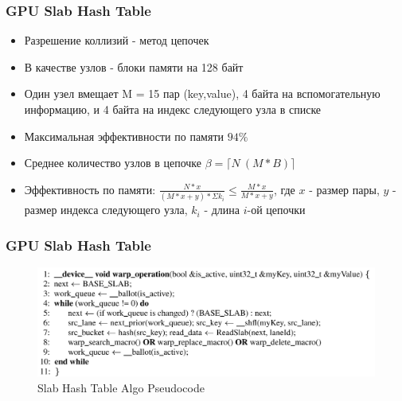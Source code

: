 \documentclass[xcolor=table,english]{beamer}
\begin{document}
\begin{frame}[fragile] \frametitle{GPU Slab Hash Table}
    \begin{itemize}
        \item Разрешение коллизий - метод цепочек
        \item В качестве узлов - блоки памяти на 128 байт
        \item Один узел вмещает M = 15 пар (key,value), 4 байта на вспомогательную информацию, и 4 байта на индекс следующего узла в списке
        \item Максимальная эффективности по памяти $94\%$
        \item Среднее количество узлов в цепочке $\beta = \lceil N \ (M * B) \rceil$
        \item Эффективность по памяти: $\frac{N * x}{(M * x + y) * \Sigma k_i} \leq \frac{M * x}{M * x + y}$, где $x$ - размер пары, $y$ - размер индекса следующего узла, $k_i$ - длина $i$-ой цепочки
    \end{itemize}
\end{frame}

\begin{frame}[fragile] \frametitle{GPU Slab Hash Table}
    \begin{minipage}[m]{0.95\linewidth}
        \begin{figure}
            \centering
            \includegraphics[width=\textwidth]{pictures/hashtable_pseudocode.png}
            \caption{Slab Hash Table Algo Pseudocode}
            \label{fig:pseudocode}
        \end{figure}
    \end{minipage}\hfill
\end{frame}
\end{document}
